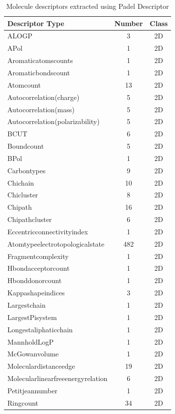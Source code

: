 \documentclass[conference]{IEEEtran}
\begin{document}
\begin{table}
	\renewcommand{\arraystretch}{1.1}
	\caption{Molecule descriptors extracted using Padel Descriptor}
	\label{table_molecule_descriptors}
	\centering
	\begin{tabular}{|l|c|c|}
		\hline 
		Descriptor Type & Number
		& Class \\ 
		\hline 
		ALOGP & 	3  & 2D \\
		APol & 	1  & 2D \\
		Aromaticatomscounts & 	1  & 2D \\
		Aromaticbondscount & 	1  & 2D \\
		Atomcount & 	13  & 2D \\
		Autocorrelation(charge) & 	5  & 2D \\
		Autocorrelation(mass) & 	5  & 2D \\
		Autocorrelation(polarizability) & 	5  & 2D \\
		BCUT & 	6  & 2D \\
		Boundcount & 	5  & 2D \\
		BPol & 	1  & 2D \\
		Carbontypes & 	9  & 2D \\
		Chichain & 	10  & 2D \\
		Chicluster & 	8  & 2D \\
		Chipath & 	16  & 2D \\
		Chipathcluster & 	6  & 2D \\
		Eccentricconnectivityindex & 	1  & 2D \\
		Atomtypeelectrotopologicalstate & 	482  & 2D \\
		Fragmentcomplexity & 	1  & 2D \\
		Hbondacceptorcount & 	1  & 2D \\
		Hbonddonorcount & 	1  & 2D \\
		Kappashapeindices & 	3  & 2D \\
		Largestchain & 	1  & 2D \\
		LargestPisystem & 	1  & 2D \\
		Longestaliphaticchain & 	1  & 2D \\
		MannholdLogP & 	1  & 2D \\
		McGowanvolume & 	1  & 2D \\
		Moleculardistanceedge & 	19  & 2D \\
		Molecularlinearfreeenergyrelation & 	6  & 2D \\
		Petitjeannumber & 	1  & 2D \\
		Ringcount & 	34  & 2D \\

\end{tabular}
\end{table}
\end{document}
